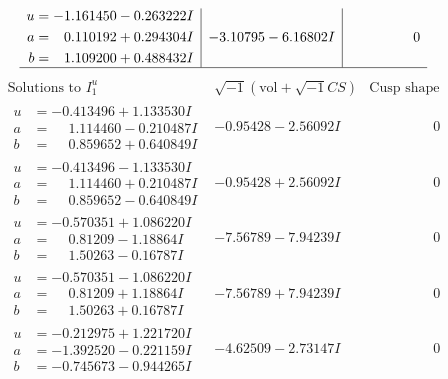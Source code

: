 \documentclass[1p]{elsarticle_modified}
\theoremstyle{definition}
\newcommand{\I}{\sqrt{-1}}
\begin{document}
$$\begin{array}{c|c|c}
\begin{aligned}
u &= -1.161450 - 0.263222 I \\
a &= \phantom{-}0.110192 + 0.294304 I \\
b &= \phantom{-}1.109200 + 0.488432 I\end{aligned}
 & -3.10795 - 6.16802 I & \phantom{-0.000000 } 0\\
 \hline 
 \end{array}$$\newpage$$\begin{array}{c|c|c}  
\text{Solutions to }I^u_{1}& \I (\text{vol} + \sqrt{-1}CS) & \text{Cusp shape}\\
 \hline 
\begin{aligned}
u &= -0.413496 + 1.133530 I \\
a &= \phantom{-}1.114460 - 0.210487 I \\
b &= \phantom{-}0.859652 + 0.640849 I\end{aligned}
 & -0.95428 - 2.56092 I & \phantom{-0.000000 } 0 \\ \hline\begin{aligned}
u &= -0.413496 - 1.133530 I \\
a &= \phantom{-}1.114460 + 0.210487 I \\
b &= \phantom{-}0.859652 - 0.640849 I\end{aligned}
 & -0.95428 + 2.56092 I & \phantom{-0.000000 } 0 \\ \hline\begin{aligned}
u &= -0.570351 + 1.086220 I \\
a &= \phantom{-}0.81209 - 1.18864 I \\
b &= \phantom{-}1.50263 - 0.16787 I\end{aligned}
 & -7.56789 - 7.94239 I & \phantom{-0.000000 } 0 \\ \hline\begin{aligned}
u &= -0.570351 - 1.086220 I \\
a &= \phantom{-}0.81209 + 1.18864 I \\
b &= \phantom{-}1.50263 + 0.16787 I\end{aligned}
 & -7.56789 + 7.94239 I & \phantom{-0.000000 } 0 \\ \hline\begin{aligned}
u &= -0.212975 + 1.221720 I \\
a &= -1.392520 - 0.221159 I \\
b &= -0.745673 - 0.944265 I\end{aligned}
 & -4.62509 - 2.73147 I & \phantom{-0.000000 } 0 \\ \hline\begin{aligned}

\end{aligned}
\end{array}$$
\end{document}

